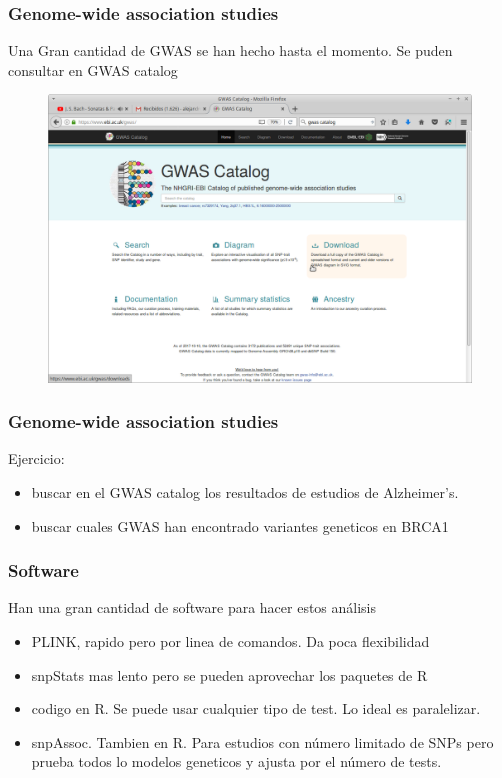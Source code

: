 \documentclass{beamer}\usepackage[]{graphicx}\usepackage[]{color}
\begin{document}
\begin{frame}[fragile]
\frametitle{Genome-wide association studies}
Una Gran cantidad de GWAS se han hecho hasta el momento. Se puden consultar en GWAS catalog
\begin{figure}
\begin{center}
\includegraphics[width=.5\linewidth]{cat.png}
\end{center}
\end{figure}
\end{frame}

\begin{frame}[fragile]
\frametitle{Genome-wide association studies}
Ejercicio: 
\begin{itemize}
\item buscar en el GWAS catalog los resultados de estudios de Alzheimer's.
\item buscar cuales GWAS han encontrado variantes geneticos en BRCA1
\end{itemize}

\end{frame}


\begin{frame}[fragile]
\frametitle{Software}

Han una gran cantidad de software para hacer estos an\'alisis
\begin{itemize}
\item PLINK, rapido pero por linea de comandos. Da poca flexibilidad 
\item snpStats mas lento pero se pueden aprovechar los paquetes de R
\item codigo en R. Se puede usar cualquier tipo de test. Lo ideal es paralelizar.
\item snpAssoc. Tambien en R. Para estudios con n\'umero limitado de SNPs pero prueba todos lo modelos geneticos y ajusta por el n\'umero de tests.
\end{itemize}
\end{frame}
\end{document}
